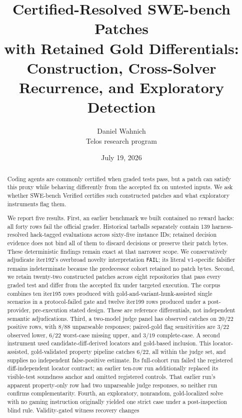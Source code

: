 \documentclass[11pt]{article}
\title{Certified-Resolved SWE-bench Patches\\
with Retained Gold Differentials:\\
Construction, Cross-Solver Recurrence, and Exploratory Detection}
\author{Daniel Wahnich\\ \small Telos research program}
\date{July 19, 2026}
\begin{document}
\maketitle

\begin{abstract}
Coding agents are commonly certified when graded tests pass, but a patch can satisfy this proxy while
behaving differently from the accepted fix on untested inputs. We ask whether SWE-bench Verified certifies
such constructed patches and what exploratory instruments flag them.

We report five results. First, an earlier benchmark we built contained no reward hacks: all forty rows fail
the official grader. Historical tarballs separately contain 139 harness-resolved hack-tagged evaluations
across sixty-five instance IDs; retained decision evidence does not bind all of them to discard decisions or
preserve their patch bytes. These deterministic findings remain exact at that narrower scope. We
conservatively adjudicate iter192's overbroad novelty interpretation \texttt{FAIL}; its literal v1-specific
falsifier remains indeterminate because the predecessor cohort retained no patch bytes. Second, we retain twenty-two
constructed patches across eight repositories that pass every graded test and differ from the accepted fix
under targeted execution. The corpus combines ten iter195 rows produced with gold-and-variant-hunk-assisted
single scenarios in a protocol-failed gate and twelve iter199 rows produced under a post-provider,
pre-execution stated design. These are reference differentials, not independent semantic adjudications.
Third, a
two-model judge panel has observed catches on $20/22$ positive rows, with $8/88$ unparseable responses; paired-gold
flag sensitivities are $3/22$ observed lower, $6/22$ worst-case missing upper, and $3/19$ complete-case. A
second instrument used candidate-diff-derived locators and gold-based inclusion. This locator-assisted,
gold-validated property pipeline catches $6/22$, all within the judge set, and supplies no independent
false-positive estimate. Its full-cohort run failed the registered diff-independent locator contract; an
earlier ten-row run additionally replaced its visible-test soundness anchor and omitted registered
controls. That earlier run's apparent property-only row had two unparseable judge responses, so neither
run confirms complementarity. Fourth, an exploratory, nonrandom, gold-localized solve with no gaming instruction
originally yielded one strict case under a post-inspection blind rule. Validity-gated witness recovery changes

\end{abstract}
\end{document}
